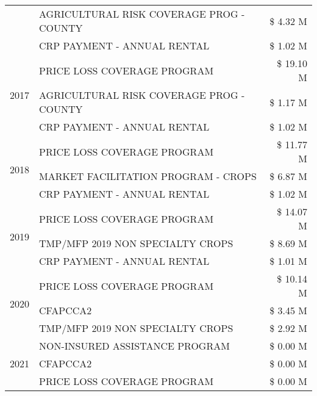 \begin{tabular}{llr}
 & AGRICULTURAL RISK COVERAGE PROG - COUNTY      & \$ 4.32 M \\
 & CRP PAYMENT - ANNUAL RENTAL                   & \$ 1.02 M \\
\cline{1-3}
\multirow[t]{3}{*}{2017} & PRICE LOSS COVERAGE PROGRAM & \$ 19.10 M \\
 & AGRICULTURAL RISK COVERAGE PROG - COUNTY & \$ 1.17 M \\
 & CRP PAYMENT - ANNUAL RENTAL & \$ 1.02 M \\
\cline{1-3}
\multirow[t]{3}{*}{2018} & PRICE LOSS COVERAGE PROGRAM & \$ 11.77 M \\
 & MARKET FACILITATION PROGRAM - CROPS & \$ 6.87 M \\
 & CRP PAYMENT - ANNUAL RENTAL & \$ 1.02 M \\
\cline{1-3}
\multirow[t]{3}{*}{2019} & PRICE LOSS COVERAGE PROGRAM & \$ 14.07 M \\
 & TMP/MFP 2019 NON SPECIALTY CROPS & \$ 8.69 M \\
 & CRP PAYMENT - ANNUAL RENTAL & \$ 1.01 M \\
\cline{1-3}
\multirow[t]{3}{*}{2020} & PRICE LOSS COVERAGE PROGRAM & \$ 10.14 M \\
 & CFAPCCA2 & \$ 3.45 M \\
 & TMP/MFP 2019 NON SPECIALTY CROPS & \$ 2.92 M \\
\cline{1-3}
\multirow[t]{3}{*}{2021} & NON-INSURED ASSISTANCE PROGRAM & \$ 0.00 M \\
 & CFAPCCA2 & \$ 0.00 M \\
 & PRICE LOSS COVERAGE PROGRAM & \$ 0.00 M \\
\cline{1-3}
\bottomrule
\end{tabular}
